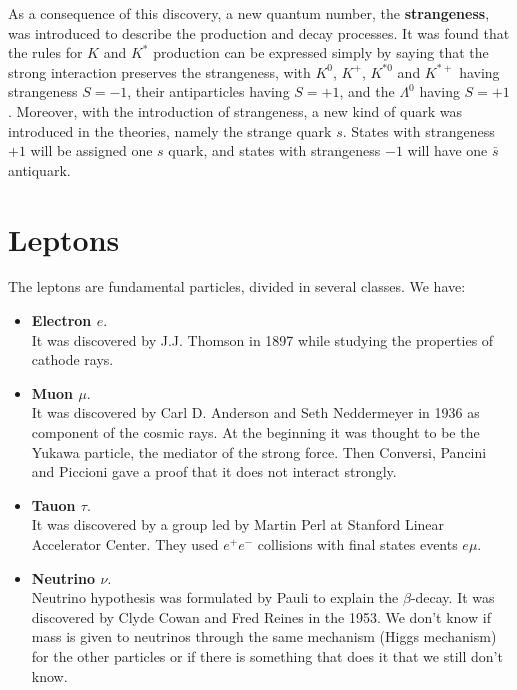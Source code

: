 \documentclass[../../main/main.tex]{subfiles}
\begin{document}
As a consequence of this discovery, a new quantum number, the \textbf{strangeness}, was introduced to describe the production and decay processes. It was found that the rules for \( K \) and \( K^* \) production can be expressed simply by saying that the strong interaction preserves the strangeness, with \( K^{0} \), \( K^{+} \), \( K^{*0} \) and \( K^{*+} \) having strangeness \( S = -1 \), their antiparticles having \( S = +1 \), and the \( \Lambda^{0} \) having \( S = +1 \). Moreover, with the introduction of strangeness, a new kind of quark was introduced in the theories, namely the strange quark \( s \). States with strangeness \( +1 \) will be assigned one \( s \) quark, and states with strangeness \( -1 \) will have one \( \bar{s} \) antiquark.





\section{Leptons}
The leptons are fundamental particles, divided in several classes. We have:
\begin{itemize}
    \item \textbf{Electron \( e \)}.\\
        It was discovered by J.J. Thomson in 1897 while studying the properties of cathode rays.
    \item \textbf{Muon \( \mu \)}.\\
        It was discovered by Carl D. Anderson and Seth Neddermeyer in 1936 as component of the cosmic rays. At the beginning it was thought to be the Yukawa particle, the mediator of the strong force. Then Conversi, Pancini and Piccioni gave a proof that it does not interact strongly.
    \item \textbf{Tauon \( \tau \)}.\\
        It was discovered by a group led by Martin Perl at Stanford Linear Accelerator Center. They used \( e^+e^- \) collisions with final states events \( e\mu \).
    \item \textbf{Neutrino \( \nu \)}.\\
        Neutrino hypothesis was formulated by Pauli to explain the \( \beta \)-decay. It was discovered by Clyde Cowan and Fred Reines in the 1953. We don't know if mass is given to neutrinos through the same mechanism (Higgs mechanism) for the other particles or if there is something that does it that we still don't know.
\end{itemize}
\end{document}
